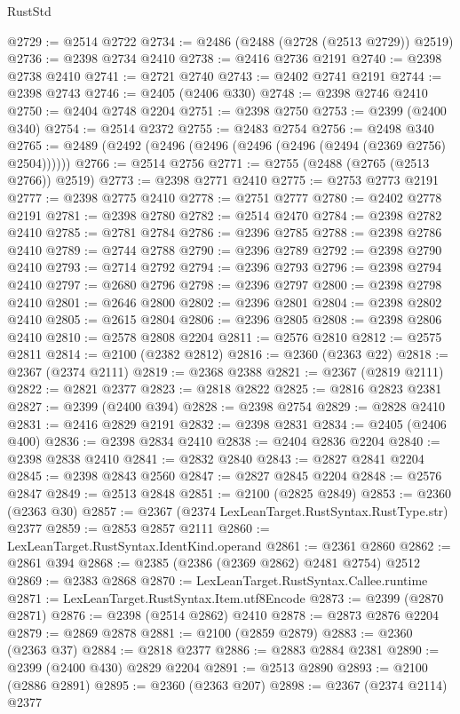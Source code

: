 \begin{lexlean}{RustStd}
\begin{coremodule}
{\begin{coremodule}
{{{{{{{{{{{{{{{{{{{{{{{{{{{{{{{{{{{{{{{{{{{{{{{{{{@2729 := @2514 @2722
@2734 := @2486 (@2488 (@2728 (@2513 @2729)) @2519)
@2736 := @2398 @2734 @2410
@2738 := @2416 @2736 @2191
@2740 := @2398 @2738 @2410
@2741 := @2721 @2740
@2743 := @2402 @2741 @2191
@2744 := @2398 @2743
@2746 := @2405 (@2406 @330)
@2748 := @2398 @2746 @2410
@2750 := @2404 @2748 @2204
@2751 := @2398 @2750
@2753 := @2399 (@2400 @340)
@2754 := @2514 @2372
@2755 := @2483 @2754
@2756 := @2498 @340
@2765 := @2489 (@2492 (@2496 (@2496 (@2496 (@2496 (@2494 (@2369 @2756) @2504))))))
@2766 := @2514 @2756
@2771 := @2755 (@2488 (@2765 (@2513 @2766)) @2519)
@2773 := @2398 @2771 @2410
@2775 := @2753 @2773 @2191
@2777 := @2398 @2775 @2410
@2778 := @2751 @2777
@2780 := @2402 @2778 @2191
@2781 := @2398 @2780
@2782 := @2514 @2470
@2784 := @2398 @2782 @2410
@2785 := @2781 @2784
@2786 := @2396 @2785
@2788 := @2398 @2786 @2410
@2789 := @2744 @2788
@2790 := @2396 @2789
@2792 := @2398 @2790 @2410
@2793 := @2714 @2792
@2794 := @2396 @2793
@2796 := @2398 @2794 @2410
@2797 := @2680 @2796
@2798 := @2396 @2797
@2800 := @2398 @2798 @2410
@2801 := @2646 @2800
@2802 := @2396 @2801
@2804 := @2398 @2802 @2410
@2805 := @2615 @2804
@2806 := @2396 @2805
@2808 := @2398 @2806 @2410
@2810 := @2578 @2808 @2204
@2811 := @2576 @2810
@2812 := @2575 @2811
@2814 := @2100 (@2382 @2812)
@2816 := @2360 (@2363 @22)
@2818 := @2367 (@2374 @2111)
@2819 := @2368 @2388
@2821 := @2367 (@2819 @2111)
@2822 := @2821 @2377
@2823 := @2818 @2822
@2825 := @2816 @2823 @2381
@2827 := @2399 (@2400 @394)
@2828 := @2398 @2754
@2829 := @2828 @2410
@2831 := @2416 @2829 @2191
@2832 := @2398 @2831
@2834 := @2405 (@2406 @400)
@2836 := @2398 @2834 @2410
@2838 := @2404 @2836 @2204
@2840 := @2398 @2838 @2410
@2841 := @2832 @2840
@2843 := @2827 @2841 @2204
@2845 := @2398 @2843 @2560
@2847 := @2827 @2845 @2204
@2848 := @2576 @2847
@2849 := @2513 @2848
@2851 := @2100 (@2825 @2849)
@2853 := @2360 (@2363 @30)
@2857 := @2367 (@2374 LexLeanTarget.RustSyntax.RustType.str) @2377
@2859 := @2853 @2857 @2111
@2860 := LexLeanTarget.RustSyntax.IdentKind.operand
@2861 := @2361 @2860
@2862 := @2861 @394
@2868 := @2385 (@2386 (@2369 @2862) @2481 @2754) @2512
@2869 := @2383 @2868
@2870 := LexLeanTarget.RustSyntax.Callee.runtime
@2871 := LexLeanTarget.RustSyntax.Item.utf8Encode
@2873 := @2399 (@2870 @2871)
@2876 := @2398 (@2514 @2862) @2410
@2878 := @2873 @2876 @2204
@2879 := @2869 @2878
@2881 := @2100 (@2859 @2879)
@2883 := @2360 (@2363 @37)
@2884 := @2818 @2377
@2886 := @2883 @2884 @2381
@2890 := @2399 (@2400 @430) @2829 @2204
@2891 := @2513 @2890
@2893 := @2100 (@2886 @2891)
@2895 := @2360 (@2363 @207)
@2898 := @2367 (@2374 @2114) @2377
}}}}}}}}}}}}}}}}}}}}}}}}}}}}}}}}}}}}}}}}}}}}}}}}}}
\end{coremodule}}
\end{coremodule}
\end{lexlean}

